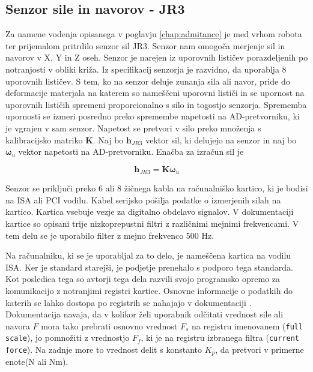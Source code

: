 \documentclass[a4paper]{article}
\begin{document}
\subsection{Senzor sile in navorov - JR3}

Za namene vodenja opisanega v poglavju \ref{chap:admitance} je med vrhom robota ter prijemalom pritrdilo senzor sil JR3. Senzor nam omogoča merjenje sil in navorov v X, Y in Z oseh. Senzor je narejen iz uporovnih lističev porazdeljenih po notranjosti v obliki križa. Iz specifikacij senzorja \cite{jr3_doc_ext} je razvidno, da uporablja 8 uporovnih lističev. S tem, ko na senzor deluje zunanja sila ali navor, pride do deformacije materjala na katerem so nameščeni uporovni lističi in se upornost na uporovnih lističih spremeni proporcionalno s silo in togostjo senzorja. Sprememba upornosti se izmeri posredno preko spremembe napetosti na AD-pretvorniku, ki je vgrajen v sam senzor. Napetost se pretvori v silo preko množenja s kalibracijsko matriko \textbf{K}. Naj bo $\textbf{h}_{JR3}$ vektor sil, ki delujejo na senzor in naj bo $\mathbf{\omega}_u$ vektor napetosti na AD-pretvorniku. Enačba za izračun sil je

\begin{equation}
\textbf{h}_{JR3} = \textbf{K} \mathbf{\omega}_u
\end{equation}



Senzor se priključi preko 6 ali 8 žičnega kabla na računalniško kartico, ki je bodisi na ISA ali PCI vodilu. Kabel serijsko pošilja podatke o izmerjenih silah na kartico. Kartica vsebuje vezje za digitalno obdelavo signalov. V dokumentaciji kartice \cite{jr3_doc_inst} so opisani trije nizkoprepustni filtri z različnimi mejnimi frekvencami. V tem delu se je uporabilo filter z mejno frekvenco 500 Hz.

Na računalniku, ki se je uporabljal za to delo, je nameščena kartica na vodilu ISA. Ker je standard starejši, je podjetje prenehalo s podporo tega standarda. Kot posledica tega so avtorji tega dela razvili svojo programsko opremo za komunikacijo z notranjimi registri kartice. Osnovne informacije o podatkih do katerih se lahko dostopa po registrih se nahajajo v dokumentaciji \cite{jr3_doc_inst}.
Dokumentacija navaja, da v kolikor želi uporabnik odčitati vrednost sile ali navora $F$ mora tako prebrati osnovno vrednost $F_s$ na registru imenovanem (\verb|full scale|), jo pomnožiti z vrednostjo $F_f$, ki je na registru izbranega filtra (\verb|current force|). Na zadnje more to vrednost delit s konstanto $K_p$, da pretvori v primerne enote(N ali Nm).
\end{document}
